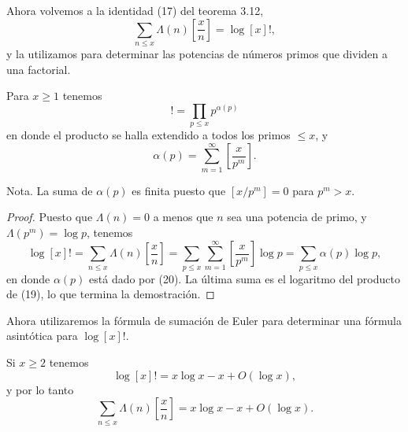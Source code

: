 \documentclass[12pt,a4paper]{book}
\begin{document}
    Ahora volvemos a la identidad (17) del teorema 3.12,
    \begin{equation*}
        \sum_{n\leq x}\Lambda(n)\left[\frac{x}{n}\right]=\log[x]!,
    \end{equation*}
    y la utilizamos para determinar las potencias de números primos que dividen a una
    factorial.

    \begin{teorema}
        Para $x\geq1$ tenemos
        \begin{equation}
            [x]!=\prod_{p\leq x}p^{\alpha(p)}
        \end{equation}
        en donde el producto se halla extendido a todos los primos $\leq x$, y
        \begin{equation}
            \alpha(p)=\sum_{m=1}^{\infty}\left[\frac{x}{p^{m}}\right].
        \end{equation}
    \end{teorema}

    Nota. La suma de $\alpha(p)$ es finita puesto que $[x/p^{m}]=0$ para $p^{m}>x$.

    \begin{proof}
        Puesto que $\Lambda(n)=0$ a menos que $n$ sea una potencia de primo, y
        $\Lambda(p^{m})=\log p$, tenemos
        \begin{equation*}
            \log[x]!=\sum_{n\leq x}\Lambda(n)\left[\frac{x}{n}\right]
            =\sum_{p\leq x}\sum_{m=1}^{\infty}\left[\frac{x}{p^{m}}\right]\log p
            =\sum_{p\leq x}\alpha(p)\log p,
        \end{equation*}
        en donde $\alpha(p)$ está dado por (20). La última suma es el logaritmo del
        producto de (19), lo que termina la demostración.
    \end{proof}

    Ahora utilizaremos la fórmula de sumación de Euler para determinar una fórmula
    asintótica para $\log[x]!$.

    \begin{teorema}
        Si $x\geq2$ tenemos
        \begin{equation}
            \log[x]!=x\log x-x+O(\log x),
        \end{equation}
        y por lo tanto
        \begin{equation}
            \sum_{n\leq x}\Lambda(n)\left[\frac{x}{n}\right]=x\log x-x+O(\log x).
        \end{equation}
    \end{teorema}
\end{document}
